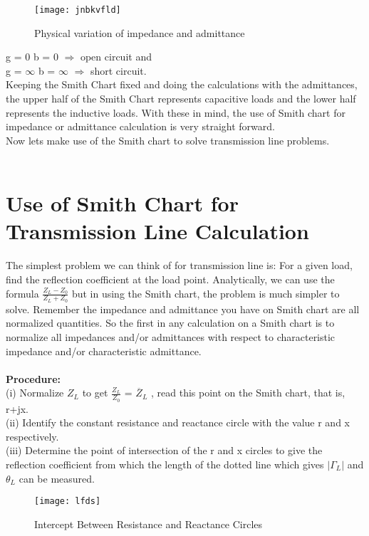 \begin{figure}[h]
	\centering
	\texttt{[image: jnbkvfld]}
	\caption{Physical variation of impedance and admittance}
	\label{fig:jnbkvfld}
\end{figure}
g = 0 b = 0 $\Longrightarrow$ open circuit and\\
g = $\infty$  b = $\infty$ $\Longrightarrow$  short circuit.\\
Keeping the Smith Chart fixed and doing the calculations with the admittances, the upper half of the Smith Chart represents capacitive loads and the lower half represents the inductive loads. With these in mind, the use of Smith chart for impedance or admittance calculation is very straight forward.\\
   Now lets make use of the Smith chart 
 to solve transmission line problems. 
 \\\\
 \section{Use of Smith Chart for Transmission Line Calculation}
The simplest problem we can think of for transmission line is: For a given load, find the reflection coefficient at the load point. Analytically, we can use the formula $\frac{Z_L - Z_0}{Z_L + Z_0}$ but in using the Smith chart, the problem is much simpler to solve. Remember the impedance and admittance you have on Smith chart are all normalized quantities. So the first in any calculation on a Smith chart is to normalize all impedances and/or admittances with respect to characteristic impedance and/or characteristic admittance.\\\\
 \textbf{Procedure:}\\
 (i) Normalize $Z_{L}$ to get $\frac{Z_{L}}{Z_{0}}$ = $\overline{Z}_{L}$ , read this point on the Smith chart, that is,  r+jx.\\
 (ii) Identify the constant resistance and reactance circle with the value r and x respectively.\\ 
(iii) Determine the point of intersection of the r and x circles to give the reflection coefficient from which the length of the dotted line which gives $|\Gamma_L|$ and $\theta_L$ can be measured.
\begin{figure}[h]
	\centering
	\texttt{[image: lfds]}
	\caption{Intercept Between Resistance and Reactance Circles}
	\label{fig:lfds}
\end{figure}

